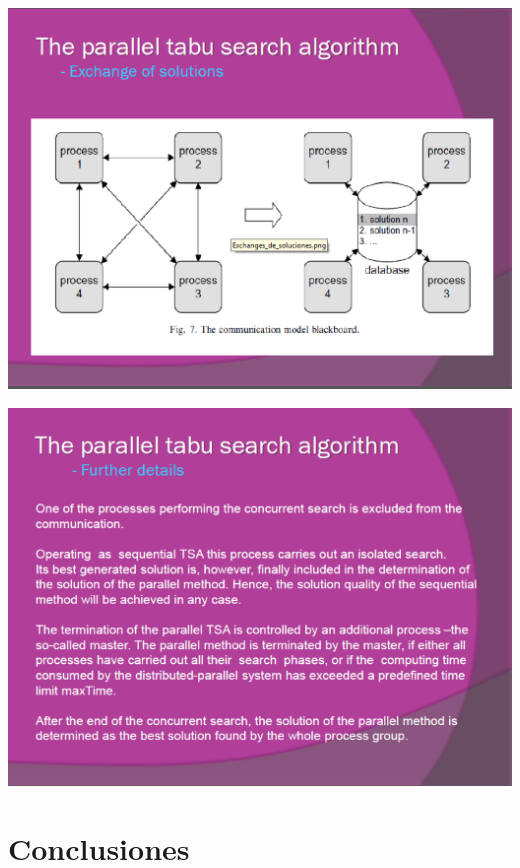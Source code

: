 \documentclass[spanish,a4paper,11pt,twoside]{report}
\begin{document}
\begin{center}
\includegraphics[width=1\textwidth]{images/picn14.eps}\\[0.25cm]
\end{center}
\begin{center}
\includegraphics[width=1\textwidth]{images/picn15.eps}\\[0.25cm]
\end{center}
\chapter{Conclusiones}
\label{chapter:conclusiones}
\end{document}
